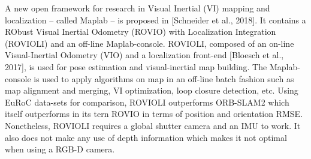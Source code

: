 \documentclass[11pt,openany]{book}
\begin{document}
A new open framework for research in Visual Inertial (VI) mapping and localization – called Maplab – is proposed in [Schneider et al., 2018]. It contains a RObust Visual Inertial Odometry (ROVIO) with Localization Integration (ROVIOLI) and an oﬀ-line Maplab-console. ROVIOLI, composed of an on-line Visual-Inertial Odometry (VIO) and a localization front-end [Bloesch et al., 2017], is used for pose estimation and visual-inertial map building. The Maplab-console is used to apply algorithms on map in an oﬀ-line batch fashion such as map alignment and merging, VI optimization, loop closure detection, etc. Using EuRoC data-sets for comparison, ROVIOLI outperforms ORB-SLAM2 which itself outperforms in its tern ROVIO in terms of position and orientation RMSE. Nonetheless, ROVIOLI requires a global shutter camera and an IMU to work. It also does not make any use of depth information which makes it not optimal when using a RGB-D camera.\\\\
\end{document}
